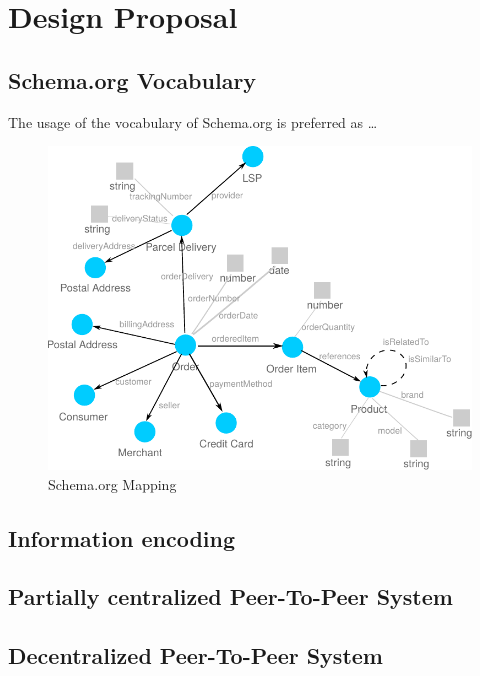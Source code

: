 
\section{Design Proposal}
\label{sec:design_proposal}

\subsection{Schema.org Vocabulary}
\label{subsec:schema_org_vocab}

The usage of the vocabulary of Schema.org is preferred as \ldots

\begin{figure}[H]
	\centering
		\includegraphics[width=0.8\columnwidth]{images/schema_org_mapping.pdf}
	\caption{Schema.org Mapping}
\label{fig:images_schema_org}
\end{figure}


\subsection{Information encoding}
\label{subsec:information_encoding}


\subsection{Partially centralized Peer-To-Peer System}
\label{subsec:p2p_partially_centralized_system}


\subsection{Decentralized Peer-To-Peer System}
\label{subsec:p2p_decentralized_system}



